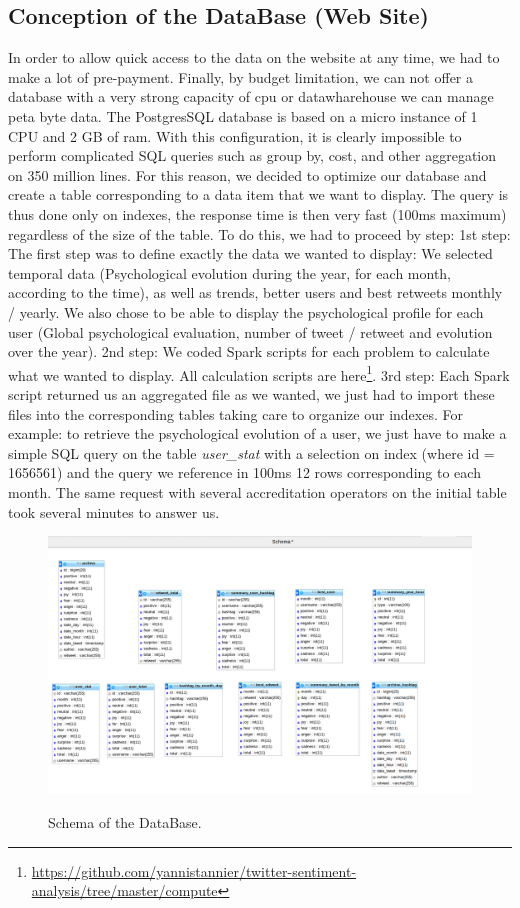 \documentclass{acmtog} %
\begin{document}
\begin{itemize}
\subsection{Conception of the DataBase (Web Site)}
\label{subsub:conception_db}

In order to allow quick access to the data on the website at any time, we had to make a lot of pre-payment.
Finally, by budget limitation, we can not offer a database with a very strong capacity of cpu or datawharehouse we can manage peta byte data. The PostgresSQL database is based on a micro instance of 1 CPU and 2 GB of ram.
With this configuration, it is clearly impossible to perform complicated SQL queries such as group by, cost, and other aggregation on 350 million lines.
For this reason, we decided to optimize our database and create a table corresponding to a data item that we want to display. The query is thus done only on indexes, the response time is then very fast (100ms maximum) regardless of the size of the table.
To do this, we had to proceed by step:
1st step:
The first step was to define exactly the data we wanted to display: We selected temporal data (Psychological evolution during the year, for each month, according to the time), as well as trends, better users and best retweets monthly / yearly. We also chose to be able to display the psychological profile for each user (Global psychological evaluation, number of tweet / retweet and evolution over the year).
2nd step:
We coded Spark scripts for each problem to calculate what we wanted to display. All calculation scripts are here\footnote{\url{https://github.com/yannistannier/twitter-sentiment-analysis/tree/master/compute}}. 
3rd step:
Each Spark script returned us an aggregated file as we wanted, we just had to import these files into the corresponding tables taking care to organize our indexes.
For example: to retrieve the psychological evolution of a user, we just have to make a simple SQL query on the table {\itshape user\_stat} with a selection on index (where id = 1656561) and the query we reference in 100ms 12 rows corresponding to each month. The same request with several accreditation operators on the initial table took several minutes to answer us.



\begin{figure}[H]
{\includegraphics[width=\linewidth]{table-web-db.png}}
\caption{Schema of the DataBase.}
  \label{fig:archivedb}
\end{figure}



\end{itemize}
\end{document}
